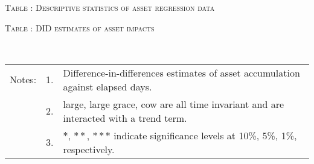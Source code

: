 \begin{table}
\hfil\textsc{\footnotesize Table \thetable: Descriptive statistics of asset regression data\label{destat.alr.sss}}\\
\setlength{\tabcolsep}{1pt}
\renewcommand{\arraystretch}{.6}
\hfil{}
\end{table}

\begin{table}
\hfil\textsc{\footnotesize Table \thetable: DID estimates of asset impacts\label{FDasset}}\\
\setlength{\tabcolsep}{1pt}
\renewcommand{\arraystretch}{.6}
\hfil{}\\
\renewcommand{\arraystretch}{1}

\vspace{-4ex}
\hfil\begin{tabular}{>{\hfill\scriptsize}p{1cm}<{}>{\hfill\scriptsize}p{.25cm}<{}>{\scriptsize}p{11.5cm}<{\hfill}}
Notes:& 1. & Difference-in-differences estimates of asset accumulation against elapsed days. \\[-1ex]
& 2. & \textsf{large, large grace, cow} are all time invariant and are interacted with a trend term. \\
& 3. & $*$, $**$, $***$ indicate significance levels at 10\%, 5\%, 1\%, respectively.\\
\end{tabular}
\end{table}

